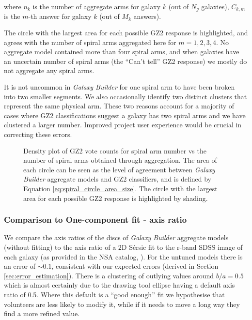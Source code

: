 \documentclass[../main.tex]{subfiles}
\begin{document}
where $n_k$ is the number of aggregate arms for galaxy $k$ (out of $N_g$ galaxies), $C_{k, m}$ is the $m$-th answer for galaxy $k$ (out of $M_k$ answers).

The circle with the largest area for each possible GZ2 response is highlighted, and agrees with the number of spiral arms aggregated here for $m=1, 2, 3, 4$. No aggregate model contained more than four spiral arms, and when galaxies have an uncertain number of spiral arms (the ``Can't tell'' GZ2 response) we mostly do not aggregate any spiral arms.

It is not uncommon in \textit{Galaxy Builder} for one spiral arm to have been broken into two smaller segments. We also occasionally identify two distinct clusters that represent the same physical arm. These two reasons account for a majority of cases where GZ2 classifications suggest a galaxy has two spiral arms and we have clustered a larger number. Improved project user experience would be crucial in correcting these errors.

\begin{figure}
  \caption{Density plot of GZ2 vote counts for spiral arm number vs the number of spiral arms obtained through aggregation. The area of each circle can be seen as the level of agreement between \textit{Galaxy Builder} aggregate models and GZ2 classifiers, and is defined by Equation \ref{eq:spiral_circle_area_size}. The circle with the largest area for each possible GZ2 response is highlighted by shading.}
  \label{fig:n_spirals_comparison}
\end{figure}


\subsubsection{Comparison to One-component fit - axis ratio}
We compare the axis ratios of the discs of \textit{Galaxy Builder} aggregate models (without fitting) to the axis ratio of a 2D S\'ersic fit to the r-band SDSS image of each galaxy (as provided in the NSA catalog, \citealt{2011AJ....142...31B}). For the untuned models there is an error of $\sim0.1$, consistent with our expected errors (derived in Section \ref{sec:error_estimation}). There is a clustering of outlying values around $b/a=0.5$ which is almost certainly due to the drawing tool ellipse having a default axis ratio of 0.5. Where this default is a ``good enough'' fit we hypothesise that volunteers are less likely to modify it, while if it needs to move a long way they find a more refined value.
\end{document}

